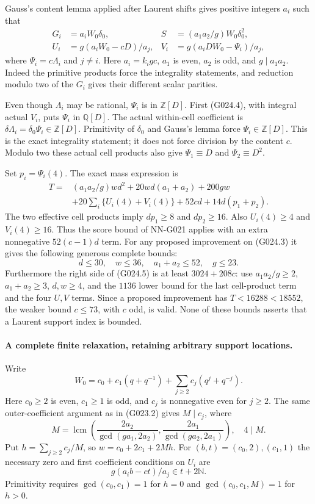 Gauss's content lemma applied after Laurent shifts gives
positive integers $a_i$ such that
\[
 \begin{aligned}
 G_i&=a_iW_0\delta_0,&
 S&=(a_1a_2/g)W_0\delta_0^2,\\
 U_i&=g(a_iW_0-cD)/a_j,&
 V_i&=g(a_iDW_0-\Psi_i)/a_j,
 \end{aligned}                                                     \tag{G024.4}
\]
where $\Psi_i=c\Lambda_i$ and $j\ne i$.
Here $a_i=k_i g c$, $a_1$ is even, $a_2$ is odd, and
$g\mid a_1a_2$. Indeed the primitive products force the
integrality statements, and reduction modulo two of the
$G_i$ gives their different scalar parities.

Even though $\Lambda_i$ may be rational, $\Psi_i$ is in
$\mathbb Z[D]$. First (G024.4), with integral actual $V_i$,
puts $\Psi_i$ in $\mathbb Q[D]$. The actual within-cell
coefficient is $\delta\Lambda_i=\delta_0\Psi_i\in\mathbb Z[D]$.
Primitivity of $\delta_0$ and Gauss's lemma force
$\Psi_i\in\mathbb Z[D]$. This is the exact integrality
statement; it does not force division by the content $c$.
Modulo two these actual cell products also give
$\Psi_1\equiv D$ and $\Psi_2\equiv D^2$.

Set $p_i=\Psi_i(4)$. The exact mass expression is
\[
 \begin{split}
 T={}&(a_1a_2/g)wd^2+20wd(a_1+a_2)+200gw\\
 &+20\sum_i\{U_i(4)+V_i(4)\}+52cd+14d(p_1+p_2).
 \end{split}                                                       \tag{G024.5}
\]
The two effective cell products imply $dp_1\ge8$ and
$dp_2\ge16$. Also $U_i(4)\ge4$ and $V_i(4)\ge16$.
Thus the score bound of NN-G021 applies with an extra
nonnegative $52(c-1)d$ term. For any proposed improvement
on (G024.3) it gives the following generous complete bounds:
\[
 d\le30,\quad w\le36,\quad a_1+a_2\le52,\quad g\le23.
 \tag{G024.6}
\]
Furthermore the right side of (G024.5) is at least
$3024+208c$: use $a_1a_2/g\ge2$, $a_1+a_2\ge3$,
$d,w\ge4$, and the $1136$ lower bound for the last
cell-product term and the four $U,V$ terms. Since a
proposed improvement has $T<16288<18552$, the weaker
bound $c\le73$, with $c$ odd, is valid. None of these
bounds asserts that a Laurent support index is bounded.

\paragraph{A complete finite relaxation, retaining arbitrary support locations.}
Write
\[
 W_0=c_0+c_1(q+q^{-1})+\sum_{j\ge2}c_j(q^j+q^{-j}).
\]
Here $c_0\ge2$ is even, $c_1\ge1$ is odd, and $c_j$
is nonnegative even for $j\ge2$. The same outer-coefficient
argument as in (G023.2) gives $M\mid c_j$, where
\[
 M=\operatorname{lcm}\left(
 \frac{2a_2}{\gcd(ga_1,2a_2)},
 \frac{2a_1}{\gcd(ga_2,2a_1)}\right),\quad 4\mid M.
\]
Put $h=\sum_{j\ge2}c_j/M$, so $w=c_0+2c_1+2Mh$.
For $(b,t)=(c_0,2),(c_1,1)$ the necessary zero and
first coefficient conditions on $U_i$ are
\[
 g(a_i b-ct)/a_j\in t+2\mathbb N.                     \tag{G024.7}
\]
Primitivity requires $\gcd(c_0,c_1)=1$ for $h=0$ and
$\gcd(c_0,c_1,M)=1$ for $h>0$.

